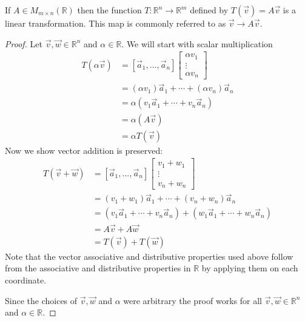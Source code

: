 \begin{proposition} If $A \in M_{m \times n}(\mathbb{R})$ then the function 
$T:\mathbb{R}^n \to \mathbb{R}^m$ defined by $T(\vec{v})=A\vec{v}$ is a linear 
transformation. This map is commonly referred to as $\vec{v} \to A\vec{v}$.
\end{proposition}
\begin{proof}
Let $\vec{v},\vec{w} \in \mathbb{R}^n$ and $\alpha \in \mathbb{R}$. 
We will start with scalar multiplication 
\begin{align*}
T(\alpha\vec{v})
&=[\vec{a}_1, \ldots, \vec{a}_n]
\begin{bmatrix}\alpha v_1\\ \vdots \\ \alpha v_n\end{bmatrix}\\
&=(\alpha v_1)\vec{a}_1+\cdots+(\alpha v_n)\vec{a}_n\\
&=\alpha (v_1\vec{a}_1+\cdots+v_n\vec{a}_n)\\
&=\alpha (A\vec{v})\\
&=\alpha T(\vec{v})
\end{align*}
Now we show vector addition is preserved:
\begin{align*}
T(\vec{v}+\vec{w})
&=[\vec{a}_1, \ldots, \vec{a}_n]\begin{bmatrix}v_1+w_1\\ \vdots \\ v_n+w_n\end{bmatrix}\\
&=(v_1+w_1)\vec{a}_1+\cdots+(v_n+w_n)\vec{a}_n\\
&=(v_1\vec{a}_1+\cdots+v_n\vec{a}_n)+(w_1\vec{a}_1+\cdots+w_n\vec{a}_n)\\
&=A\vec{v}+A\vec{w}\\
&=T(\vec{v})+T(\vec{w})
\end{align*}
Note that the vector associative and distributive properties used above 
follow from the associative and distributive properties in $\mathbb{R}$ 
by applying them on each coordinate.

Since the choices of $\vec{v},\vec{w}$ and $\alpha$ were arbitrary the proof 
works for all $\vec{v},\vec{w} \in \mathbb{R}^n$ and $\alpha \in \mathbb{R}$.
\end{proof}
